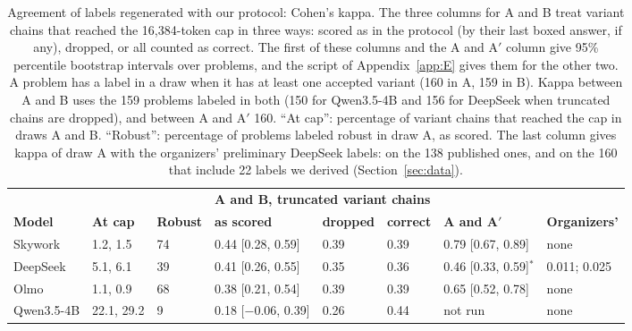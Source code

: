 \documentclass{article}
\begin{document}
\begin{table}[t]
\caption{Agreement of labels regenerated with our protocol: Cohen's kappa. The three columns for A and B treat variant chains that reached the 16,384-token cap in three ways: scored as in the protocol (by their last boxed answer, if any), dropped, or all counted as correct. The first of these columns and the A and A$'$ column give 95\% percentile bootstrap intervals over problems, and the script of Appendix~\ref{app:E} gives them for the other two. A problem has a label in a draw when it has at least one accepted variant (160 in A, 159 in B). Kappa between A and B uses the 159 problems labeled in both (150 for Qwen3.5-4B and 156 for DeepSeek when truncated chains are dropped), and between A and A$'$ 160. ``At cap'': percentage of variant chains that reached the cap in draws A and B. ``Robust'': percentage of problems labeled robust in draw A, as scored. The last column gives kappa of draw A with the organizers' preliminary DeepSeek labels: on the 138 published ones, and on the 160 that include 22 labels we derived (Section~\ref{sec:data}).}
\label{tab:label}
\centering
\small
\setlength{\tabcolsep}{3pt}
\begin{tabular}{@{}llllllll@{}}
\toprule
& & & \multicolumn{3}{l}{\textbf{A and B, truncated variant chains}} & & \\
\cmidrule(lr){4-6}
\textbf{Model} & \textbf{At cap} & \textbf{Robust} & \textbf{as scored} & \textbf{dropped} & \textbf{correct} & \textbf{A and A$'$} & \textbf{Organizers'} \\
\midrule
Skywork & 1.2, 1.5 & 74 & 0.44 [0.28, 0.59] & 0.39 & 0.39 & 0.79 [0.67, 0.89] & none \\
DeepSeek & 5.1, 6.1 & 39 & 0.41 [0.26, 0.55] & 0.35 & 0.36 & 0.46 [0.33, 0.59]$^{*}$ & 0.011; 0.025 \\
Olmo & 1.1, 0.9 & 68 & 0.38 [0.21, 0.54] & 0.39 & 0.39 & 0.65 [0.52, 0.78] & none \\
Qwen3.5-4B & 22.1, 29.2 & 9 & 0.18 [$-$0.06, 0.39] & 0.26 & 0.44 & not run & none \\
\bottomrule
\end{tabular}
\par{}
\end{table}
\end{document}
